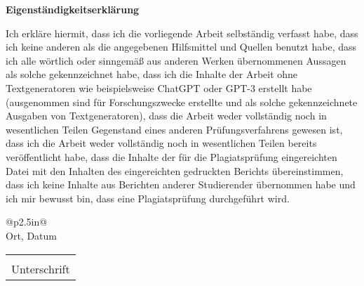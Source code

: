 \documentclass[a4paper, 12pt]{proc}
\begin{document}
\begin{center}
	\textbf{Eigenständigkeitserklärung}
\end{center}
Ich erkläre hiermit, dass ich die vorliegende Arbeit selbständig verfasst habe,
dass ich keine anderen als die angegebenen Hilfsmittel und Quellen benutzt
habe, dass ich alle wörtlich oder sinngemäß aus anderen Werken übernommenen
Aussagen als solche gekennzeichnet habe, dass ich die Inhalte der Arbeit ohne
Textgeneratoren wie beispielsweise ChatGPT oder GPT-3 erstellt habe
(ausgenommen sind für Forschungszwecke erstellte und als solche gekennzeichnete
Ausgaben von Textgeneratoren), dass die Arbeit weder vollständig noch in
wesentlichen Teilen Gegenstand eines anderen Prüfungsverfahrens gewesen ist,
dass ich die Arbeit weder vollständig noch in wesentlichen Teilen bereits
veröffentlicht habe, dass die Inhalte der für die Plagiatsprüfung eingereichten
Datei mit den Inhalten des eingereichten gedruckten Berichts übereinstimmen,
dass ich keine Inhalte aus Berichten anderer Studierender übernommen habe und
ich mir bewusst bin, dass eine Plagiatsprüfung durchgeführt wird.\\

\vspace{25mm}
\begin{minipage}{0.5\linewidth}
	\centering
	\begin{tabular}{@{}p{2.5in}@{}}
		\hrulefill \\
		Ort, Datum \\
	\end{tabular}
\end{minipage}
\vspace{25mm}
\begin{minipage}{0.5\linewidth}
	\centering
	\begin{tabular}{@{}p{2.5in}@{}}
		\hrulefill   \\
		Unterschrift \\
	\end{tabular}
\end{minipage}
\end{document}

